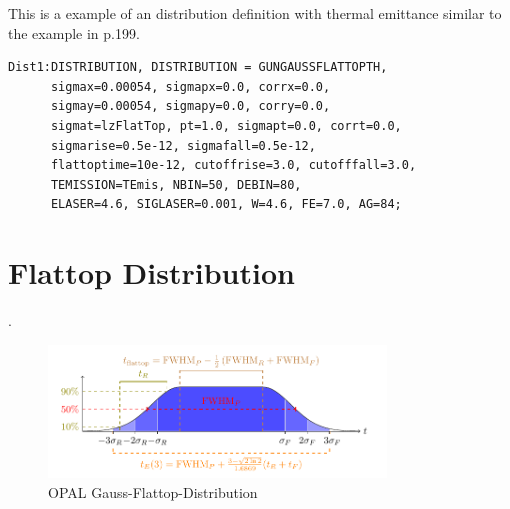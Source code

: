 This is a example of an \opal distribution definition with thermal emittance similar to the example in \cite{clen:2000} p.199.

\begin{verbatim}
Dist1:DISTRIBUTION, DISTRIBUTION = GUNGAUSSFLATTOPTH,
      sigmax=0.00054, sigmapx=0.0, corrx=0.0,
      sigmay=0.00054, sigmapy=0.0, corry=0.0,
      sigmat=lzFlatTop, pt=1.0, sigmapt=0.0, corrt=0.0,
      sigmarise=0.5e-12, sigmafall=0.5e-12, 
      flattoptime=10e-12, cutoffrise=3.0, cutofffall=3.0,
      TEMISSION=TEmis, NBIN=50, DEBIN=80,
      ELASER=4.6, SIGLASER=0.001, W=4.6, FE=7.0, AG=84;  

\end{verbatim}

\section{Flattop Distribution}
\label{sec:dist_flattop}.

\begin{figure}[h]
  \begin{center}
    \includegraphics[width=0.8\textwidth]{./figures/flattop.pdf}
    \caption{\textsc{OPAL} Gauss-Flattop-Distribution}
    \label{fig:flattop}
  \end{center} 
\end{figure}

